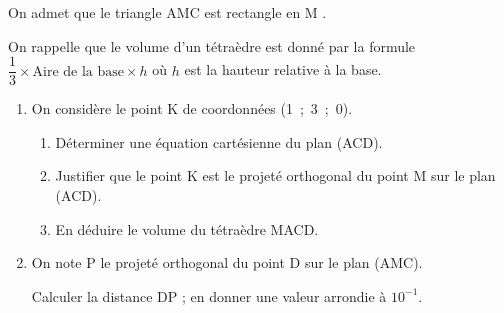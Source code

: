 \documentclass[10pt]{article}
\begin{document}
On admet que le triangle AMC est rectangle en M .

On rappelle que le volume d'un tétraèdre est donné par la formule $\dfrac13 \times\text{Aire de la base}  \times h$ où $h$ est la hauteur relative à la base.

\begin{enumerate}[resume]
\item On considère le point K de coordonnées (1~;~3~;~0).
	\begin{enumerate}
		\item Déterminer une équation cartésienne du plan (ACD).
		\item Justifier que le point K est le projeté orthogonal du point M sur le plan (ACD).
		\item En déduire le volume du tétraèdre MACD.
	\end{enumerate}	
\item On note P le projeté orthogonal du point D sur le plan (AMC).

Calculer la distance DP ; en donner une valeur arrondie à $10^{-1}$.
\end{enumerate}
\end{document}
